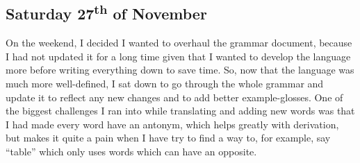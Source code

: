 \documentclass[a4paper,10pt]{article}
\begin{document}
\subsection{Saturday 27\textsuperscript{th} of November}
On the weekend, I decided I wanted to overhaul the grammar document, because I had not
updated it for a long time given that I wanted to develop the language more before writing
everything down to save time. So, now that the language was much more well-defined, I sat
down to go through the whole grammar and update it to reflect any new changes and to add
better example-glosses. One of the biggest challenges I ran into while translating and
adding new words was that I had made every word have an antonym, which helps greatly with
derivation, but makes it quite a pain when I have try to find a way to, for example, say
``table'' which only uses words which can have an opposite.
\end{document}
